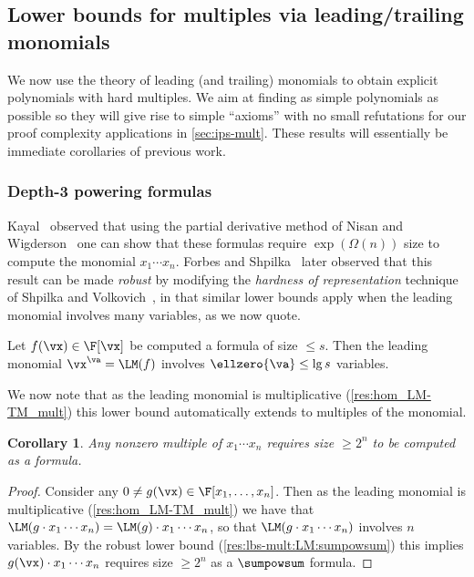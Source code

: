 \documentclass[11pt]{article}
\numberwithin{equation}{section}
\newtheorem{corollary}[theorem]{Corollary}
\theoremstyle{definition}
\theoremstyle{plain}
\begin{document}
\subsection{Lower bounds for multiples via leading/trailing monomials}\label{sec:lbs-mult:LM}

We now use the theory of leading (and trailing) monomials to obtain explicit polynomials with hard multiples. We aim at finding as simple polynomials as possible so they will give rise to simple ``axioms'' with no small refutations for our proof complexity applications in \autoref{sec:ips-mult}. These results will essentially be immediate corollaries of previous work.

\subsubsection{Depth-3 powering formulas}

Kayal~\cite{Kayal08} observed that using the partial derivative method of Nisan and Wigderson~\cite{NisanWigderson96} one can show that these formulas require $\exp(\Omega(n))$ size to compute the monomial $x_1\cdots x_n$.  Forbes and Shpilka~\cite{ForbesShpilka13a} later observed that this result can be made \emph{robust} by modifying the \emph{hardness of representation} technique of Shpilka and Volkovich~\cite{ShpilkaVolkovich09}, in that similar lower bounds apply when the leading monomial involves many variables, as we now quote.

\begin{theoremwp}\label{res:lbs-mult:LM:sumpowsum}
        Let $f(\vx)\in\F[\vx]$ be computed a \sumpowsum formula of size $\le s$.  Then the leading monomial $\vx^\va=\LM(f)$ involves $\ellzero{\va}\le \lg s$ variables.
\end{theoremwp}

We now note that as the leading monomial is multiplicative (\autoref{res:hom_LM-TM_mult}) this lower bound automatically extends to multiples of the monomial.

\begin{corollary}\label{res:lbs-mult:sumpowsum}
        Any nonzero multiple of $x_1\cdots x_n$ requires size $\ge 2^n$ to be computed as a \sumpowsum formula.
\end{corollary}
\begin{proof}
        Consider any $0\ne g(\vx)\in\F[x_1,\ldots,x_n]$.  Then as the leading monomial is multiplicative (\autoref{res:hom_LM-TM_mult}) we have that $\LM(g\cdot x_1\cdots x_n)=\LM(g)\cdot x_1\cdots x_n$, so that $\LM(g\cdot x_1\cdots x_n)$ involves $n$ variables.  By the robust lower bound (\autoref{res:lbs-mult:LM:sumpowsum}) this implies $g(\vx)\cdot x_1\cdots x_n$ requires size $\ge 2^n$ as a $\sumpowsum$ formula.
\end{proof}
\end{document}
